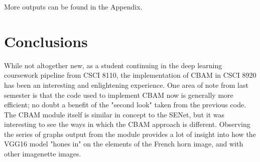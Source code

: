 \documentclass{article}
\begin{document}
More outputs can be found in the  Appendix.

\section{Conclusions}
While not altogether new, as a student continuing in the deep learning coursework pipeline from CSCI 8110, the implementation of CBAM in CSCI 8920 has been an interesting and enlightening experience.
One area of note from last semester is that the code used to implement CBAM now is generally more efficient; no doubt a benefit of the "second look" taken from the previous code.
The CBAM module itself is similar in concept to the SENet, but it was interesting to see the ways in which the CBAM approach is different.
Observing the series of graphs output from the module provides a lot of insight into how the VGG16 model "hones in" on the elements of the French horn image, and with other imagenette images.




\end{document}
